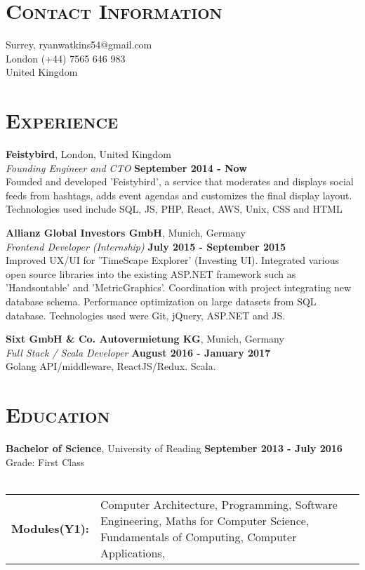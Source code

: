 \documentclass[line, margin, 10pt]{res}
\begin{document}
\renewcommand{\namefont}{ \LARGE \bf }


\begin{resume}

\section{\textsc{Contact Information}}
Surrey,  \hfill{ryanwatkins54@gmail.com}\\
London \hfill{(+44) 7565 646 983 }\\
United Kingdom 

\section{\textsc{Experience}}


{\bf Feistybird}, London, United Kingdom \\
\textit{Founding Engineer and CTO} \hfill {\bf September 2014 - Now}\\
Founded and developed 'Feistybird', a service that moderates and displays social feeds from hashtags, adds event agendas and customizes the final display layout.
Technologies used include SQL, JS, PHP, React, AWS, Unix, CSS and HTML

{\bf Allianz Global Investors GmbH}, Munich, Germany\\
{\it Frontend Developer (Internship)} {\bf \hfill July 2015 - September 2015}\\
Improved UX/UI for 'TimeScape Explorer' (Investing UI). Integrated various open source libraries into the existing ASP.NET framework such as 'Handsontable' and 'MetricGraphics'.
 Coordination with project integrating new database schema. Performance optimization on large datasets from SQL database. Technologies used were Git, jQuery, ASP.NET and JS.

{\bf Sixt GmbH \& Co. Autovermietung KG}, Munich, Germany\\
{\it Full Stack / Scala Developer} {\bf \hfill August 2016 - January 2017}\\
Golang API/middleware, ReactJS/Redux. Scala.

\section{\textsc{Education}}
{\bf Bachelor of Science}, University of Reading {\bf \hfill September 2013 - July 2016}\\
Grade: First Class \\
\\
\begin{tabular}[t]{@{} p{1.2in} p{3.75in} @{}}
\bf{Modules(Y1):}  & Computer Architecture,
  Programming, 
  Software Engineering,
  Maths for Computer Science,
  Fundamentals of Computing,
  Computer Applications,
\end{tabular}


\end{resume}
\end{document}
